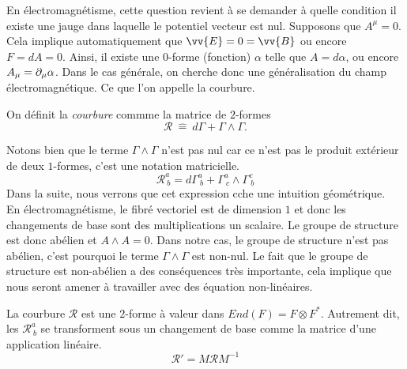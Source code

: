 \documentclass[a4paper,11pt]{report}
\begin{document}
                \begin{exmp}
                    En électromagnétisme, cette question revient à se demander à quelle condition il existe une jauge dans laquelle le potentiel vecteur est nul. Supposons que $A^\mu = 0$. Cela implique automatiquement que $\vv{E} = 0 = \vv{B}$ ou encore $F = dA = 0$. Ainsi, il existe une $0$-forme (fonction) $\alpha$ telle que $A = d\alpha$, ou encore $A_\mu = \partial_\mu\alpha$. Dans le cas générale, on cherche donc une généralisation du champ électromagnétique. Ce que l'on appelle la courbure.
                \end{exmp}
                
                \begin{defn}
                    On définit la \textit{courbure} commme la matrice de $2$-formes
                    \begin{equation}
                        \mathscr{R}~\hat{=}~d\Gamma + \Gamma\wedge\Gamma.
                    \end{equation}
                \end{defn}
                Notons bien que le terme $\Gamma\wedge\Gamma$ n'est pas nul car ce n'est pas le produit extérieur de deux $1$-formes, c'est une notation matricielle.
                \begin{equation}
                    \mathscr{R}^a_{~b} = d\Gamma^a_{~b} + \Gamma^a_{~c}\wedge\Gamma^c_{~b}
                \end{equation}
                Dans la suite, nous verrons que cet expression cche une intuition géométrique.\\
                
                En électromagnétisme, le fibré vectoriel est de dimension $1$ et donc les changements de base sont des multiplications un scalaire. Le groupe de structure est donc abélien et $A\wedge A = 0$. Dans notre cas, le groupe de structure n'est pas abélien, c'est pourquoi le terme $\Gamma\wedge\Gamma$ est non-nul. Le fait que le groupe de structure est non-abélien a des conséquences très importante, cela implique que nous seront amener à travailler avec des équation non-linéaires.
                
                \begin{thm}\begin{leftbar}
                    La courbure $\mathscr{R}$ est une $2$-forme à  valeur dans $End(F)= F\otimes F^*$. Autrement dit, les $\mathscr{R}^a_{~b}$ se transforment sous un changement de base comme la matrice d'une application linéaire.
                    \begin{equation}
                        \mathscr{R}' = M\mathscr{R}M^{-1}
                    \end{equation}
                \end{leftbar}\end{thm}
                
\end{document}
